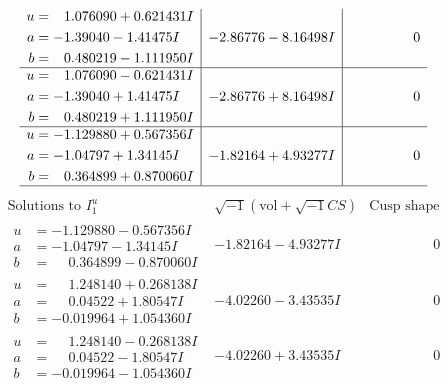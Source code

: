 \documentclass[1p]{elsarticle_modified}
\theoremstyle{definition}
\newcommand{\I}{\sqrt{-1}}
\begin{document}
$$\begin{array}{c|c|c}
\begin{aligned}
u &= \phantom{-}1.076090 + 0.621431 I \\
a &= -1.39040 - 1.41475 I \\
b &= \phantom{-}0.480219 - 1.111950 I\end{aligned}
 & -2.86776 - 8.16498 I & \phantom{-0.000000 } 0 \\ \hline\begin{aligned}
u &= \phantom{-}1.076090 - 0.621431 I \\
a &= -1.39040 + 1.41475 I \\
b &= \phantom{-}0.480219 + 1.111950 I\end{aligned}
 & -2.86776 + 8.16498 I & \phantom{-0.000000 } 0 \\ \hline\begin{aligned}
u &= -1.129880 + 0.567356 I \\
a &= -1.04797 + 1.34145 I \\
b &= \phantom{-}0.364899 + 0.870060 I\end{aligned}
 & -1.82164 + 4.93277 I & \phantom{-0.000000 } 0\\
 \hline 
 \end{array}$$\newpage$$\begin{array}{c|c|c}  
\text{Solutions to }I^u_{1}& \I (\text{vol} + \sqrt{-1}CS) & \text{Cusp shape}\\
 \hline 
\begin{aligned}
u &= -1.129880 - 0.567356 I \\
a &= -1.04797 - 1.34145 I \\
b &= \phantom{-}0.364899 - 0.870060 I\end{aligned}
 & -1.82164 - 4.93277 I & \phantom{-0.000000 } 0 \\ \hline\begin{aligned}
u &= \phantom{-}1.248140 + 0.268138 I \\
a &= \phantom{-}0.04522 + 1.80547 I \\
b &= -0.019964 + 1.054360 I\end{aligned}
 & -4.02260 - 3.43535 I & \phantom{-0.000000 } 0 \\ \hline\begin{aligned}
u &= \phantom{-}1.248140 - 0.268138 I \\
a &= \phantom{-}0.04522 - 1.80547 I \\
b &= -0.019964 - 1.054360 I\end{aligned}
 & -4.02260 + 3.43535 I & \phantom{-0.000000 } 0 \\ \hline\begin{aligned}

\end{aligned}
\end{array}$$
\end{document}
